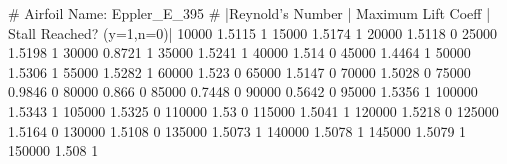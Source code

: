 # Airfoil Name: Eppler_E_395
# |Reynold's Number | Maximum Lift Coeff | Stall Reached? (y=1,n=0)|
10000 1.5115 1
15000 1.5174 1
20000 1.5118 0
25000 1.5198 1
30000 0.8721 1
35000 1.5241 1
40000 1.514 0
45000 1.4464 1
50000 1.5306 1
55000 1.5282 1
60000 1.523 0
65000 1.5147 0
70000 1.5028 0
75000 0.9846 0
80000 0.866 0
85000 0.7448 0
90000 0.5642 0
95000 1.5356 1
100000 1.5343 1
105000 1.5325 0
110000 1.53 0
115000 1.5041 1
120000 1.5218 0
125000 1.5164 0
130000 1.5108 0
135000 1.5073 1
140000 1.5078 1
145000 1.5079 1
150000 1.508 1
